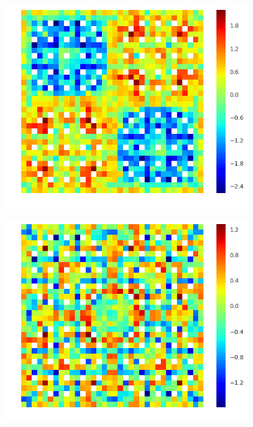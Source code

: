 \begin{figure}[h!]
\begin{subfigure}{.33\textwidth}
  \centering
  \includegraphics[width=\linewidth]{figures/quantification/2x2/null-fiss-err-8}
  \caption{}
  \label{fig:chap8-2x2-null-fiss-8}
\end{subfigure}%
\begin{subfigure}{.33\textwidth}
  \centering
  \includegraphics[width=\linewidth]{figures/quantification/2x2/null-fiss-err-70}
  \caption{}
  \label{fig:chap8-2x2-null-fiss-70}
\end{subfigure}
\begin{subfigure}{.33\textwidth}

\end{subfigure}
\end{figure}
